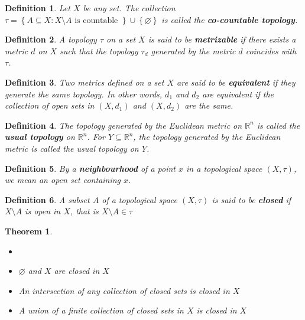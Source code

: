 \documentclass[14pt,twoside]{extreport}
\theoremstyle{dotless}
\newtheorem*{defn}{Definition}
\newtheorem*{thm}{Theorem} %
\begin{document}
\begin{defn}
    Let $X$ be any set. The collection $\tau = \left\{ A \subseteq X  :  X \setminus A \text{ is countable } \right\} \cup \left\{ \varnothing \right\}$ is called the \textbf{co-countable topology}.
\end{defn}



\begin{defn}
A topology $\tau$ on a set $X$ is said to be \textbf{metrizable} if there exists a metric $d$ on $X$ such that the topology $\tau_d$ generated by the metric $d$ coincides with $\tau$.
\end{defn}

\begin{defn}
Two metrics defined on a set $X$ are said to be \textbf{equivalent} if they generate the same topology. 
In other words, $d_1$ and $d_2$ are equivalent if the collection of open sets in $\left (X, d_1\right )$ and $\left (X, d_2\right )$ are the same.
\end{defn}

\begin{defn}
The topology generated by the Euclidean metric on $\mathbb{R} ^n$ is called the \textbf{usual topology} on $\mathbb{R} ^n$.
For $Y \subseteq \mathbb{R} ^n$, the topology generated by the Euclidean metric is called the usual topology on $Y$.
\end{defn}

\begin{defn}
By a \textbf{neighbourhood} of a point $x$ in a topological space $\left (X, \tau\right )$, we mean an open set containing $x$.
\end{defn}

\begin{defn}
A subset $A$ of a topological space $\left (X, \tau\right )$ is said to be \textbf{closed} if $X \setminus A$ is open in $X$, that is $X \setminus A \in \tau$
\end{defn}

\begin{thm}
    \begin{itemize}
        \item[]
        \item  $\varnothing$ and $X$ are closed in $X$
        \item An intersection of any collection of closed sets is closed in $X$
        \item A union of a \textit{finite} collection of closed sets in $X$ is closed in $X$
    \end{itemize}
\end{thm}
\end{document}
